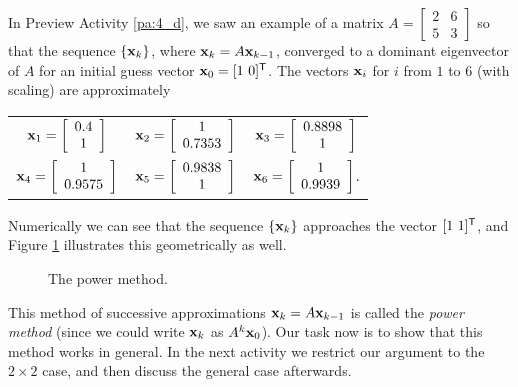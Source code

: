 In Preview Activity \ref{pa:4_d}, we saw an example of a matrix $A = \left[ \begin{array}{cc} 2&6 \\ 5&3 \end{array} \right]$ so that the sequence $\{\mathbf{x}_k\}$, where $\mathbf{x}_k = A \mathbf{x}_{k-1}$, converged to a dominant eigenvector of $A$ for an initial guess vector $\vx_0 = [1 \ 0]^{\tr}$. The vectors $\mathbf{x}_i$ for $i$ from $1$ to $6$ (with scaling) are approximately
\begin{center}
\renewcommand{\arraystretch}{1.5}
\begin{tabular}{ccc}
$\mathbf{x}_1 = \left[ \begin{array}{c} 0.4 \\ 1 \end{array} \right]$ & $\mathbf{x}_2 = \left[ \begin{array}{c} 1 \\ 0.7353 \end{array} \right]$ & $\mathbf{x}_3 = \left[ \begin{array}{c} 0.8898 \\ 1 \end{array} \right]$  \\
$\mathbf{x}_4 = \left[ \begin{array}{c} 1 \\ 0.9575 \end{array} \right]$ & $\mathbf{x}_5 = \left[ \begin{array}{c} 0.9838 \\ 1 \end{array} \right]$ & $\mathbf{x}_6 = \left[ \begin{array}{c} 1 \\ 0.9939 \end{array} \right]$.
\end{tabular}
\end{center}
Numerically we can see that the sequence $\{\mathbf{x}_k\}$ approaches the vector $[1 \ 1]^{\mathsf{T}}$, and Figure \ref{F:4_e_1} illustrates this geometrically as well. 
\begin{figure}[h]
\begin{center}
\end{center}
\caption{The power method.}
\label{F:4_e_1}
\end{figure}
This method of successive approximations $\mathbf{x}_k = A \mathbf{x}_{k-1}$ is called the \emph{power method} (since we could write $\mathbf{x}_k$ as $A^k \mathbf{x}_0$). Our task now is to show that this method works in general. In the next activity we restrict our argument to the $2 \times 2$ case, and then discuss the general case afterwards. 



